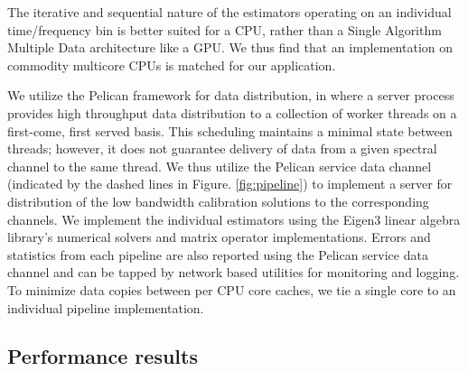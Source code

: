 \documentclass[referee]{aa}
\begin{document}
The iterative and sequential nature of the estimators operating on an individual
time/frequency bin  is better suited for  a CPU, rather than  a Single Algorithm
Multiple Data architecture  like a GPU.  We thus find  that an implementation on
commodity multicore CPUs is matched for our application.

We   utilize   the  Pelican   \citep{salvini2011pelican}   framework  for   data
distribution,  in   where  a  server  process  provides   high  throughput  data
distribution to  a collection  of worker threads  on a first-come,  first served
basis. This scheduling maintains a minimal  state between threads; however, it does
not guarantee delivery of data from a given spectral channel to the same thread.
We thus utilize the Pelican service  data channel (indicated by the dashed lines
in Figure.   \ref{fig:pipeline}) to implement  a server for distribution  of the
low bandwidth calibration solutions  to the corresponding channels. We implement
the  individual  estimators using  the  Eigen3  \citep{eigenweb} linear  algebra
library's  numerical solvers  and matrix  operator implementations.   Errors and
statistics from each  pipeline are also reported using  the Pelican service data
channel and  can be  tapped  by network  based  utilities  for monitoring  and
logging. To  minimize data copies between per  CPU core caches, we  tie a single
core to an individual pipeline implementation.


\subsection{Performance results}
\end{document}
